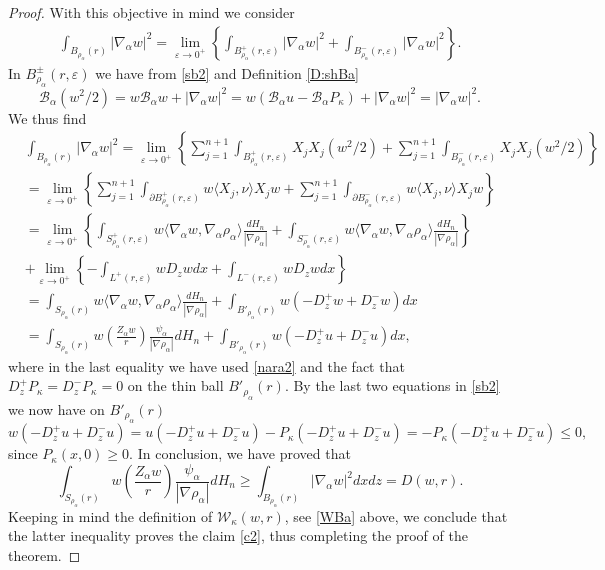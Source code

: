 \documentclass[11pt]{amsart}
\theoremstyle{plain}
\numberwithin{equation}{section}
\begin{document}
\begin{proof}
With this objective in mind we consider
\begin{align*}
\int_{{B_{\rho_\alpha}(r)}} |{\nabla_\alpha} w|^2   = \underset{{\varepsilon}\to 0^+}{\lim} \left\{\int_{{B^+_{\rho_\alpha}(r,{\varepsilon})}} |{\nabla_\alpha} w|^2 +  \int_{{B^-_{\rho_\alpha}(r,{\varepsilon})}} |{\nabla_\alpha} w|^2 \right\}.
\end{align*}
In $B^\pm_{\rho_\alpha}(r,{\varepsilon})$ we have from \eqref{sb2} and Definition \ref{D:shBa}
\[
{\mathcal{B}_\alpha}(w^2/2) = w {\mathcal{B}_\alpha} w + |{\nabla_\alpha} w|^2 = w({\mathcal{B}_\alpha} u - {\mathcal{B}_\alpha} P_\kappa) + |{\nabla_\alpha} w|^2 =  |{\nabla_\alpha} w|^2.
\]
We thus find
\begin{align*}
& \int_{{B_{\rho_\alpha}(r)}} |{\nabla_\alpha} w|^2  = \underset{{\varepsilon}\to 0^+}{\lim} \left\{\sum_{j=1}^{n+1} \int_{{B^+_{\rho_\alpha}(r,{\varepsilon})}} X_j X_j (w^2/2) + \sum_{j=1}^{n+1}  \int_{{B^-_{\rho_\alpha}(r,{\varepsilon})}} X_j X_j (w^2/2) \right\}
\\
& = \underset{{\varepsilon}\to 0^+}{\lim} \left\{\sum_{j=1}^{n+1} \int_{{{\partial} B^+_{\rho_\alpha}(r,{\varepsilon})}} w \langle X_j,\nu\rangle  X_j w + \sum_{j=1}^{n+1}  \int_{{{\partial} B^-_{\rho_\alpha}(r,{\varepsilon})}} w \langle X_j,\nu\rangle  X_j w  \right\}
\\
& = \underset{{\varepsilon}\to 0^+}{\lim} \left\{\int_{{S^+_{\rho_\alpha}(r,{\varepsilon})}} w \langle{\nabla_\alpha} w,{\nabla_\alpha} \rho_\alpha\rangle \frac{dH_{n}}{|\nabla {\rho_\alpha}|}+ \int_{{S^-_{\rho_\alpha}(r,{\varepsilon})}} w \langle{\nabla_\alpha} w,{\nabla_\alpha} \rho_\alpha\rangle \frac{dH_{n}}{|\nabla {\rho_\alpha}|}\right\}
\\
& + \underset{{\varepsilon}\to 0^+}{\lim} \left\{- \int_{{L^+(r,{\varepsilon})}} w D_z w dx + \int_{{L^-(r,{\varepsilon})}} w D_z w dx\right\}
\\
& = \int_{{S_{\rho_\alpha}(r)}} w \langle{\nabla_\alpha} w,{\nabla_\alpha} \rho_\alpha\rangle \frac{dH_{n}}{|\nabla {\rho_\alpha}|} + \int_{{B'_{\rho_\alpha}(r)}} w(-D^+_z w + D^-_z w) dx
\\
& = \int_{S_{\rho_\alpha}(r)} w\left(\frac{Z_\alpha w}{r}\right)\frac{\psi_\alpha}{|\nabla {\rho_\alpha}|}dH_{n} + \int_{{B'_{\rho_\alpha}(r)}} w(-D^+_z u + D^-_z u) dx,
\end{align*}
where in the last equality we have used \eqref{nara2} and the fact that $D_z^+ P_\kappa = D_z^-P_\kappa = 0$ on the thin ball $B'_{\rho_\alpha}(r)$. By the last two equations in \eqref{sb2} we now have on $B'_{\rho_\alpha}(r)$
\[
w(-D^+_z u + D^-_z u) = u(-D^+_z u + D^-_z u) - P_\kappa(-D^+_z u + D^-_z u)  = - P_\kappa(-D^+_z u + D^-_z u)  \le 0,
\]
since $P_\kappa(x,0) \ge 0$. In conclusion, we have proved that
\[
\int_{S_{\rho_\alpha}(r)} w\left(\frac{Z_\alpha w}{r}\right)\frac{\psi_\alpha}{|\nabla {\rho_\alpha}|}dH_{n} \ge \int_{{B_{\rho_\alpha}(r)}} |{\nabla_\alpha} w|^2 dx dz = D(w,r).
\]
Keeping in mind the definition of $\mathcal W_\kappa(w,r)$, see \eqref{WBa} above, we conclude that the latter inequality proves the claim \eqref{c2}, thus completing the proof of the theorem.

\end{proof}
\end{document}
